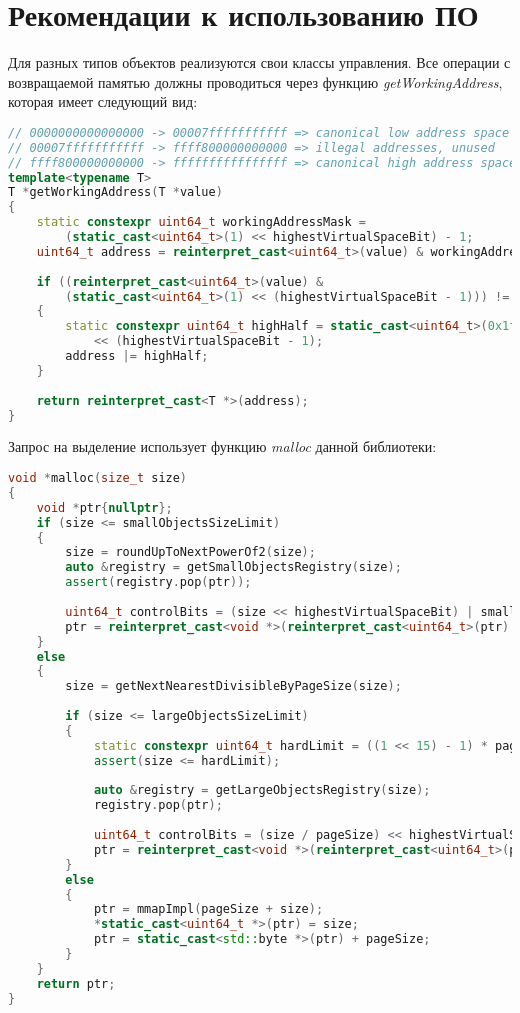\section{Рекомендации к использованию ПО}
Для разных типов объектов реализуются свои классы управления. Все операции с возвращаемой памятью должны проводиться через функцию \textit{getWorkingAddress}, которая имеет следующий вид:

\begin{lstlisting}[language=c++,numbers=none]
// 0000000000000000 -> 00007fffffffffff => canonical low address space half
// 00007fffffffffff -> ffff800000000000 => illegal addresses, unused
// ffff800000000000 -> ffffffffffffffff => canonical high address space half
template<typename T>
T *getWorkingAddress(T *value)
{
	static constexpr uint64_t workingAddressMask =
		(static_cast<uint64_t>(1) << highestVirtualSpaceBit) - 1;
	uint64_t address = reinterpret_cast<uint64_t>(value) & workingAddressMask;
	
	if ((reinterpret_cast<uint64_t>(value) &
		(static_cast<uint64_t>(1) << (highestVirtualSpaceBit - 1))) != 0)
	{
		static constexpr uint64_t highHalf = static_cast<uint64_t>(0x1ffff)
			<< (highestVirtualSpaceBit - 1);
		address |= highHalf;
	}
	
	return reinterpret_cast<T *>(address);
}
\end{lstlisting}

Запрос на выделение использует функцию \textit{malloc} данной библиотеки:
\begin{lstlisting}[language=c++,numbers=none]
void *malloc(size_t size)
{
	void *ptr{nullptr};
	if (size <= smallObjectsSizeLimit)
	{
		size = roundUpToNextPowerOf2(size);
		auto &registry = getSmallObjectsRegistry(size);
		assert(registry.pop(ptr));
		
		uint64_t controlBits = (size << highestVirtualSpaceBit) | smallObjectMask;
		ptr = reinterpret_cast<void *>(reinterpret_cast<uint64_t>(ptr) | controlBits);
	}
	else
	{
		size = getNextNearestDivisibleByPageSize(size);
		
		if (size <= largeObjectsSizeLimit)
		{
			static constexpr uint64_t hardLimit = ((1 << 15) - 1) * pageSize;
			assert(size <= hardLimit);
			
			auto &registry = getLargeObjectsRegistry(size);
			registry.pop(ptr);
			
			uint64_t controlBits = (size / pageSize) << highestVirtualSpaceBit;
			ptr = reinterpret_cast<void *>(reinterpret_cast<uint64_t>(ptr) | controlBits);
		}
		else
		{
			ptr = mmapImpl(pageSize + size);
			*static_cast<uint64_t *>(ptr) = size;
			ptr = static_cast<std::byte *>(ptr) + pageSize;
		}
	}
	return ptr;
}
\end{lstlisting}

